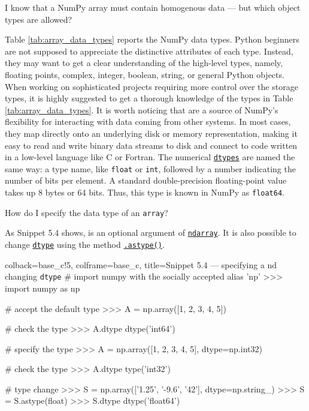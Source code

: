\documentclass[a4paper,11pt]{book}
\newcommand{\question}[1]{%
    \begin{tcolorbox}[colback=comp_c!10,colframe=comp_c,sidebyside align=top,width=\linewidth,before skip=1ex]
        #1
    \end{tcolorbox}
    \switchcolumn%
}
\newcommand{\note}[1]{%
    \begin{tcolorbox}[colback=white!0,colframe=white!10,width=\linewidth,before skip=1ex]
        #1
    \end{tcolorbox}
}
\begin{document}
\begin{paracol}{2}
	\question{\raggedright I know that a NumPy array must contain homogenous data --- but which object types are allowed?}
	\note{Table \ref{tab:array_data_types} reports the NumPy data types. Python beginners are not supposed to appreciate the distinctive attributes of each type. Instead, they may want to get a clear understanding of the high-level types, namely, floating points, complex, integer, boolean, string, or general Python objects. When working on sophisticated projects requiring more control over the storage types, it is highly suggested to get a thorough knowledge of the types in Table \ref{tab:array_data_types}. It is worth noticing that \href{https://numpy.org/doc/stable/reference/generated/numpy.ndarray.dtype.html}{\texxttt{dtypes}} are a source of NumPy's flexibility for interacting with data coming from other systems. In most cases, they map directly onto an underlying disk or memory representation, making it easy to read and write binary data streams to disk and connect to code written in a low-level language like C or Fortran. The numerical \href{https://numpy.org/doc/stable/reference/generated/numpy.ndarray.dtype.html}{\texttt{dtypes}} are named the same way: a type name, like \texttt{float} or \texttt{int}, followed by a number indicating the number of bits per element. A standard double-precision floating-point value takes up 8 bytes or 64 bits. Thus, this type is known in NumPy as \texttt{float64}.}
\end{paracol}

\begin{paracol}{2}
	\question{\raggedright How do I specify the data type of an \texttt{array}?}
	\note{As Snippet 5.4 shows, \href{https://numpy.org/doc/stable/reference/generated/numpy.ndarray.dtype.html}{\textttt{dtype}} is an optional argument of \href{https://numpy.org/doc/stable/reference/generated/numpy.ndarray.html}{\texttt{ndarray}}. It is also possible to change \href{https://numpy.org/doc/stable/reference/generated/numpy.ndarray.dtype.html}{\texttt{dtype}} using the method \href{https://numpy.org/doc/stable/reference/generated/numpy.ndarray.astype.html}{\texttt{.astype()}}.}
\end{paracol}

\begin{pythoncode}[linenos=true,]{colback=base_c!5, colframe=base_c, title=\sffamily Snippet 5.4 --- specifying a nd changing \texttt{dtype}}
# import numpy with the socially accepted alias 'np'
>>> import numpy as np

# accept the default type
>>> A = np.array([1, 2, 3, 4, 5])

# check the type
>>> A.dtype
dtype('int64')

# specify the type
>>> A = np.array([1, 2, 3, 4, 5], dtype=np.int32)

# check the type
>>> A.dtype
type('int32')

# type change 
>>> S = np.array(['1.25', '-9.6', '42'], dtype=np.string_)
>>> S = S.astype(float)
>>> S.dtype
dtype('float64')

\end{pythoncode}
\end{document}
